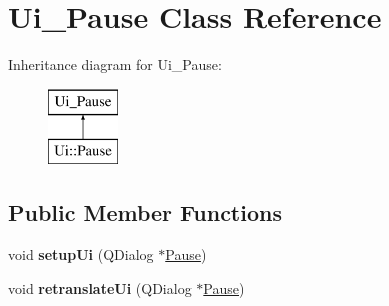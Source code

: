 \hypertarget{class_ui___pause}{\section{Ui\-\_\-\-Pause Class Reference}
\label{class_ui___pause}
}
Inheritance diagram for Ui\-\_\-\-Pause\-:\begin{figure}[H]
\begin{center}
\leavevmode
\includegraphics[height=2.000000cm]{class_ui___pause}
\end{center}
\end{figure}
\subsection*{Public Member Functions}
\begin{DoxyCompactItemize}
\item 
\hypertarget{class_ui___pause_af60e3e93c9c9c38a158724db32d41028}{void {\bfseries setup\-Ui} (Q\-Dialog $\ast$\hyperlink{class_pause}{Pause})}\label{class_ui___pause_af60e3e93c9c9c38a158724db32d41028}

\item 
\hypertarget{class_ui___pause_a6ffdb8372507fe77e7de36b822e30da1}{void {\bfseries retranslate\-Ui} (Q\-Dialog $\ast$\hyperlink{class_pause}{Pause})}\label{class_ui___pause_a6ffdb8372507fe77e7de36b822e30da1}

\end{DoxyCompactItemize}
